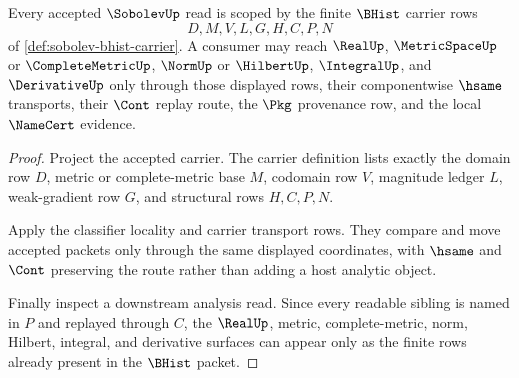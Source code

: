 \begin{theorem}
\label{thm:sobolev-bhist-carrier-scope}
Every accepted $\SobolevUp$ read is scoped by the finite $\BHist$ carrier rows
$$
D,M,V,L,G,H,C,P,N
$$
of \autoref{def:sobolev-bhist-carrier}. A consumer may reach $\RealUp$, $\MetricSpaceUp$ or $\CompleteMetricUp$, $\NormUp$ or $\HilbertUp$, $\IntegralUp$, and $\DerivativeUp$ only through those displayed rows, their componentwise $\hsame$ transports, their $\Cont$ replay route, the $\Pkg$ provenance row, and the local $\NameCert$ evidence.
\end{theorem}
\begin{proof}
Project the accepted carrier. The carrier definition lists exactly the domain row $D$, metric or complete-metric base $M$, codomain row $V$, magnitude ledger $L$, weak-gradient row $G$, and structural rows $H,C,P,N$.

Apply the classifier locality and carrier transport rows. They compare and move accepted packets only through the same displayed coordinates, with $\hsame$ and $\Cont$ preserving the route rather than adding a host analytic object.

Finally inspect a downstream analysis read. Since every readable sibling is named in $P$ and replayed through $C$, the $\RealUp$, metric, complete-metric, norm, Hilbert, integral, and derivative surfaces can appear only as the finite rows already present in the $\BHist$ packet.
\end{proof}

